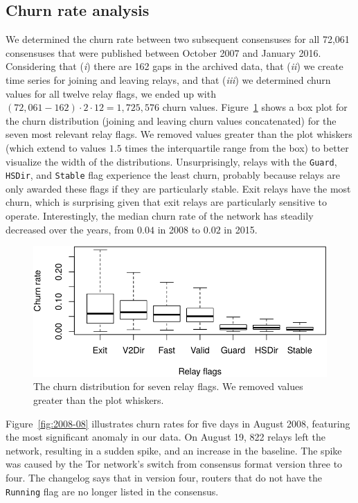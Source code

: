 \subsection{Churn rate analysis}
\label{sec:churn}
We determined the churn rate between two subsequent consensuses for all 72,061
consensuses that were published between October 2007 and January 2016.
Considering that (\emph{i}) there are 162 gaps in the archived data, that
(\emph{ii}) we create time series for joining and leaving relays, and that
(\emph{iii}) we determined churn values for all twelve relay flags, we ended up
with $(72,061 - 162) \cdot 2 \cdot 12 = 1,725,576$ churn values.
Figure~\ref{fig:churn-boxplot} shows a box plot for the churn distribution
(joining and leaving churn values concatenated) for the seven most relevant
relay flags.  We removed values greater than the plot whiskers (which extend to
values $1.5$ times the interquartile range from the box) to better visualize the
width of the distributions.  Unsurprisingly, relays with the \texttt{Guard},
\texttt{HSDir}, and \texttt{Stable} flag experience the least churn, probably
because relays are only awarded these flags if they are particularly stable.
Exit relays have the most churn, which is surprising given that exit relays are
particularly sensitive to operate.  Interestingly, the median churn rate of the
network has steadily decreased over the years, from $0.04$ in 2008 to $0.02$ in
2015.

\begin{figure}[t]
	\centering
	\includegraphics[width=\linewidth]{diagrams/churn-boxplot.pdf}
	\caption{The churn distribution for seven relay flags.  We removed values
		greater than the plot whiskers.}
	\label{fig:churn-boxplot}
\end{figure}

Figure~\ref{fig:2008-08} illustrates churn rates for five days in August 2008,
featuring the most significant anomaly in our data.  On August 19, 822 relays
left the network, resulting in a sudden spike, and an increase in the baseline.
The spike was caused by the Tor network's switch from consensus format version
three to four.  The changelog says that in version four, routers that
do not have the \texttt{Running} flag are no longer listed in the consensus.

